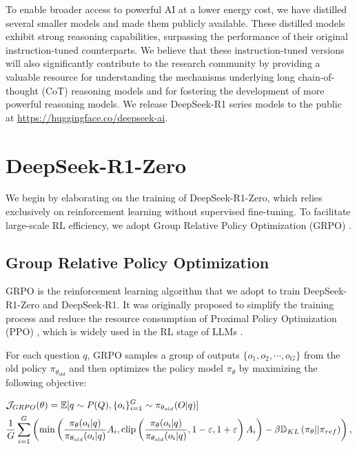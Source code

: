 To enable broader access to powerful AI at a lower energy cost, we have distilled several smaller models and made them publicly available. These distilled models exhibit strong reasoning capabilities, surpassing the performance of their original instruction-tuned counterparts. We believe that these instruction-tuned versions will also significantly contribute to the research community by providing a valuable resource for understanding the mechanisms underlying long chain-of-thought (CoT) reasoning models and for fostering the development of more powerful reasoning models. We release DeepSeek-R1 series  models to the public at \url{https://huggingface.co/deepseek-ai}. 

\section{ DeepSeek-R1-Zero}

\label{sec:ds-zero}
We begin by elaborating on the training of DeepSeek-R1-Zero, which relies exclusively on reinforcement learning without supervised fine-tuning. To facilitate large-scale RL efficiency, we adopt Group Relative Policy Optimization (GRPO) \citep{deepseekmath}.

\subsection{Group Relative Policy Optimization} \label{method:grpo}
GRPO \citep{deepseekmath} is the reinforcement learning algorithm that we adopt to train DeepSeek-R1-Zero and DeepSeek-R1. It was originally proposed to simplify the training process and reduce the resource consumption of Proximal Policy Optimization (PPO) \citep{schulman2017proximal}, which is widely used in the RL stage of LLMs \citep{ouyang2022training}. 

For each question $q$, GRPO samples a group of outputs $\{o_1, o_2, \cdots, o_G\}$ from the old policy $\pi_{\theta_{old}}$ and then optimizes the policy model $\pi_{\theta}$ by maximizing the following objective:

\begin{equation}
\begin{split}
    \footnotesize
    & \mathcal{J}_{GRPO}(\theta) = \mathbb{E}{[q \sim P(Q), \{o_i\}_{i=1}^G \sim \pi_{\theta_{old}}(O|q)]}  \\
    & \frac{1}{G}\sum_{i=1}^G \left( \min \left( \frac{\pi_\theta(o_i |q)}{\pi_{\theta_{old}}(o_i |q)} A_i, \text{clip} \left( \frac{\pi_\theta(o_i |q)}{\pi_{\theta_{old}}(o_i |q)}, 1 - \varepsilon, 1 + \varepsilon \right)  A_i \right) - \beta \mathbb{D}_{KL}\left(\pi_{\theta} || \pi_{ref}\right)\right) ,
\end{split}
\label{eq:GRPO-obj}
\end{equation}

